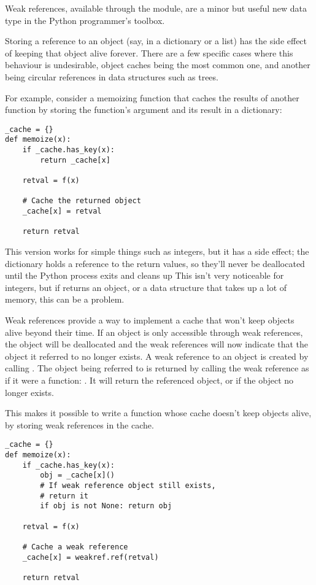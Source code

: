 \documentclass{howto}
\begin{document}
Weak references, available through the  module, are a
minor but useful new data type in the Python programmer's toolbox.

Storing a reference to an object (say, in a dictionary or a list) has
the side effect of keeping that object alive forever.  There are a few
specific cases where this behaviour is undesirable, object caches
being the most common one, and another being circular references in
data structures such as trees.

For example, consider a memoizing function that caches the results of
another function  by storing the function's
argument and its result in a dictionary:

\begin{verbatim}
_cache = {}
def memoize(x):
    if _cache.has_key(x):
        return _cache[x]

    retval = f(x)

    # Cache the returned object
    _cache[x] = retval

    return retval
\end{verbatim}

This version works for simple things such as integers, but it has a
side effect; the  dictionary holds a reference to the
return values, so they'll never be deallocated until the Python
process exits and cleans up This isn't very noticeable for integers,
but if  returns an object, or a data structure that
takes up a lot of memory, this can be a problem.

Weak references provide a way to implement a cache that won't keep
objects alive beyond their time.  If an object is only accessible
through weak references, the object will be deallocated and the weak
references will now indicate that the object it referred to no longer
exists.  A weak reference to an object  is created by calling
.  The object being referred to is
returned by calling the weak reference as if it were a function:
.  It will return the referenced object, or  if
the object no longer exists. 

This makes it possible to write a  function whose
cache doesn't keep objects alive, by storing weak references in the
cache.

\begin{verbatim}
_cache = {}
def memoize(x):
    if _cache.has_key(x):
        obj = _cache[x]()
        # If weak reference object still exists,
        # return it
        if obj is not None: return obj
 
    retval = f(x)

    # Cache a weak reference
    _cache[x] = weakref.ref(retval)

    return retval
\end{verbatim}
\end{document}
